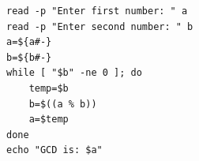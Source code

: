 \begin{verbatim}
read -p "Enter first number: " a
read -p "Enter second number: " b
a=${a#-}
b=${b#-}
while [ "$b" -ne 0 ]; do
    temp=$b
    b=$((a % b))
    a=$temp
done
echo "GCD is: $a"
\end{verbatim}